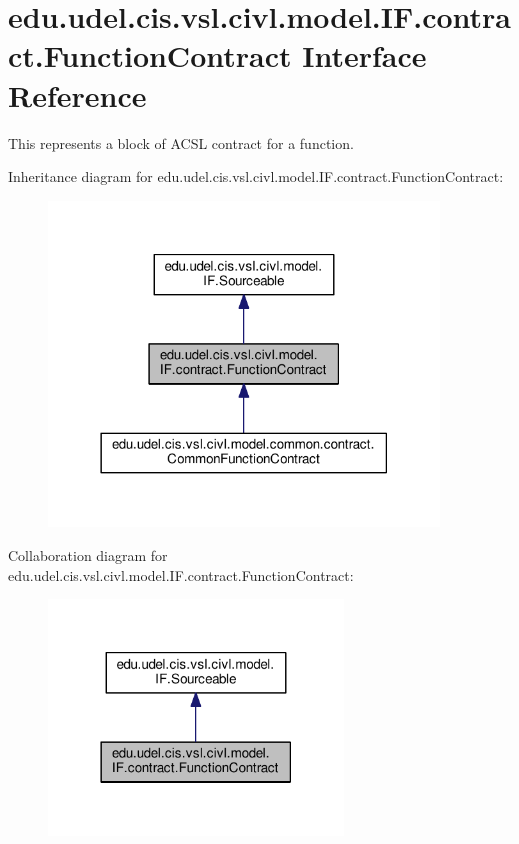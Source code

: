 \hypertarget{interfaceedu_1_1udel_1_1cis_1_1vsl_1_1civl_1_1model_1_1IF_1_1contract_1_1FunctionContract}{}\section{edu.\+udel.\+cis.\+vsl.\+civl.\+model.\+I\+F.\+contract.\+Function\+Contract Interface Reference}
\label{interfaceedu_1_1udel_1_1cis_1_1vsl_1_1civl_1_1model_1_1IF_1_1contract_1_1FunctionContract}


This represents a block of A\+C\+S\+L contract for a function.  




Inheritance diagram for edu.\+udel.\+cis.\+vsl.\+civl.\+model.\+I\+F.\+contract.\+Function\+Contract\+:
\nopagebreak
\begin{figure}[H]
\begin{center}
\leavevmode
\includegraphics[width=294pt]{interfaceedu_1_1udel_1_1cis_1_1vsl_1_1civl_1_1model_1_1IF_1_1contract_1_1FunctionContract__inherit__graph}
\end{center}
\end{figure}


Collaboration diagram for edu.\+udel.\+cis.\+vsl.\+civl.\+model.\+I\+F.\+contract.\+Function\+Contract\+:
\nopagebreak
\begin{figure}[H]
\begin{center}
\leavevmode
\includegraphics[width=222pt]{interfaceedu_1_1udel_1_1cis_1_1vsl_1_1civl_1_1model_1_1IF_1_1contract_1_1FunctionContract__coll__graph}
\end{center}
\end{figure}
